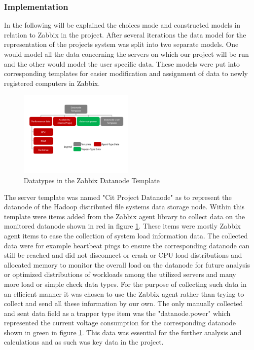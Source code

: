 \subsubsection{Implementation}
	In the following will be explained the choices made and constructed models in relation to Zabbix in the project.
	After several iterations the data model for the representation of the projects system was split into two separate models. One would model all the data concerning the servers on which our project will be run and the other would model the user specific data. These models were put into corresponding templates for easier modification and assignment of data to newly registered computers in Zabbix.
\begin{figure}[ht]
\centering
\includegraphics[width=0.5\textwidth]{img/ZabbixDatanodeTemp} 

\caption{Datatypes in the Zabbix Datanode Template}
\label{zabbix_datanode_template}
\end{figure}
	The server template was named "Cit Project Datanode" as to represent the datanode of the Hadoop distributed file systems data storage node. Within this template were items added from the Zabbix agent library to collect data on the monitored datanode shown in red in  figure \ref{zabbix_datanode_template}. These items were mostly Zabbix agent items to ease the collection of system load information data. The collected data were for example heartbeat pings to ensure the corresponding datanode can still be reached and did not disconnect or crash or CPU load distributions and allocated memory to monitor the overall load on the datanode for future analysis or optimized distributions of workloads among the utilized servers and many more load or simple check data types. For the purpose of collecting such data in an efficient manner it was chosen to use the Zabbix agent rather than trying to collect and send all these information by our own. The only manually collected and sent data field as a trapper type item was the "datanode.power" which represented the current voltage consumption for the corresponding datanode shown in green in figure \ref{zabbix_datanode_template}. This data was essential for the further analysis and calculations and as such was key data in the project.

